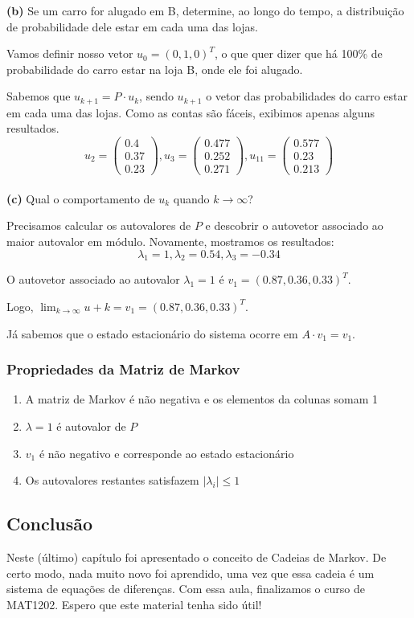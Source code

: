 \documentclass[12pt]{article}
\begin{document}
\textbf{(b)} Se um carro for alugado em B, determine, ao longo do tempo, a distribuição de probabilidade dele estar em cada uma das lojas.

Vamos definir nosso vetor $u_0=(0,1,0)^T$, o que quer dizer que há 100\% de probabilidade do carro estar na loja B, onde ele foi alugado. 

Sabemos que $u_{k+1}=P\cdot u_k$, sendo $u_{k+1}$ o vetor das probabilidades do carro estar em cada uma das lojas. Como as contas são fáceis, exibimos apenas alguns resultados.
\begin{equation*}
	u_2=\begin{pmatrix}
		0.4 \\
		0.37 \\
		0.23
	\end{pmatrix},
	u_3=\begin{pmatrix}
		0.477 \\
		0.252 \\
		0.271
	\end{pmatrix},
	u_{11}=\begin{pmatrix}
		0.577 \\
		0.23 \\
		0.213
	\end{pmatrix}
\end{equation*} \\

\textbf{(c)} Qual o comportamento de $u_k$ quando $k\to \infty$?

Precisamos calcular os autovalores de $P$ e descobrir o autovetor associado ao maior autovalor em módulo. Novamente, mostramos os resultados:
\begin{equation*}
	\lambda_1=1, \lambda_2=0.54, \lambda_3=-0.34
\end{equation*}

O autovetor associado ao autovalor $\lambda_1=1$ é $v_1=(0.87,0.36,0.33)^T$.

Logo, $\lim_{k\to\infty}u+k=v_1=(0.87,0.36,0.33)^T$.

Já sabemos que o estado estacionário do sistema ocorre em $A\cdot v_1=v_1$.

\subsubsection{Propriedades da Matriz de Markov}

\begin{enumerate}
	\item A matriz de Markov é não negativa e os elementos da colunas somam 1
	\item $\lambda=1$ é autovalor de $P$
	\item $v_1$ é não negativo e corresponde ao estado estacionário
	\item Os autovalores restantes satisfazem $|\lambda_i|\leq1$
\end{enumerate}
\subsection{Conclusão}
Neste (último) capítulo foi apresentado o conceito de Cadeias de Markov. De certo modo, nada muito novo foi aprendido, uma vez que essa cadeia é um sistema de equações de diferenças. Com essa aula, finalizamos o curso de MAT1202. Espero que este material tenha sido útil!
\end{document}
